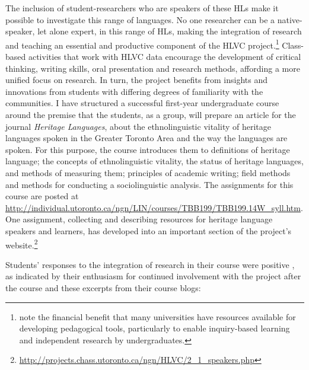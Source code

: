 \documentclass[output=paper]{LSP/langsci}
\begin{document}
The inclusion of student-researchers who are speakers of these HLs make it possible to investigate this range of languages. No one researcher can be a native-speaker, let alone expert, in this range of HLs, making the integration of research and teaching an essential and productive component of the HLVC project.\footnote{\citet{van_herk_undergraduate-conducted_2015} note the financial benefit that many universities have resources available for developing pedagogical tools, particularly to enable inquiry-based learning and independent research by undergraduates.}  Class-based activities that work with HLVC data encourage the development of critical thinking, writing skills, oral presentation and research methods, affording a more unified focus on research. In turn, the project benefits from insights and innovations from students with differing degrees of familiarity with the communities. I have structured a successful first-year undergraduate course around the premise that the students, as a group, will prepare an article for the journal \textit{Heritage Languages}, about the ethnolinguistic vitality of heritage languages spoken in the Greater Toronto Area and the way the languages are spoken. For this purpose, the course introduces them to definitions of {\textquotedbl}heritage language{\textquotedbl}; the concepts of ethnolinguistic vitality, the status of heritage languages, and methods of measuring them; principles of academic writing; field methods and methods for conducting a sociolinguistic analysis. The assignments for this course are posted at \url{http://individual.utoronto.ca/ngn/LIN/courses/TBB199/TBB199.14W_syll.htm}. One assignment, collecting and describing resources for heritage language speakers and learners, has developed into an important section of the project’s website.\footnote{\url{http://projects.chass.utoronto.ca/ngn/HLVC/2_1_speakers.php}} 

Students' responses to the integration of research in their course were positive%
, as indicated by their enthusiasm for continued involvement with the project after the course and these excerpts from their course blogs:
\end{document}
